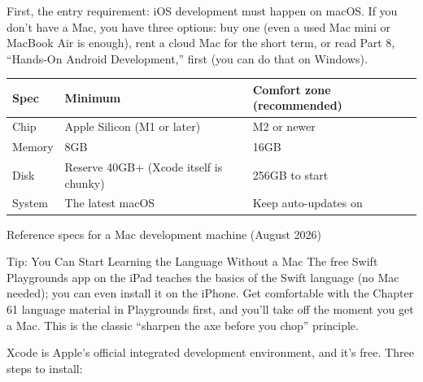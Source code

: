 


First, the entry requirement: iOS development must happen on macOS. If you don't have a Mac, you have three options: buy one (even a used Mac mini or MacBook Air is enough), rent a cloud Mac for the short term, or read Part 8, “Hands-On Android Development,” first (you can do that on Windows).

\begin{center}
\begin{tabularx}{\linewidth}{|X|X|X|}
\hline
\textbf{Spec} & \textbf{Minimum} & \textbf{Comfort zone (recommended)} \tabularnewline
\hline
Chip & Apple Silicon (M1 or later) & M2 or newer \tabularnewline
Memory & 8GB & 16GB \tabularnewline
Disk & Reserve 40GB+ (Xcode itself is chunky) & 256GB to start \tabularnewline
System & The latest macOS & Keep auto-updates on \tabularnewline
\hline
\end{tabularx}
\end{center}

\begin{center}\small\color{gray}Reference specs for a Mac development machine (August 2026)\end{center}

\begin{tcbinfo}{Tip: You Can Start Learning the Language Without a Mac}
The free Swift Playgrounds app on the iPad teaches the basics of the Swift language (no Mac needed); you can even install it on the iPhone. Get comfortable with the Chapter 61 language material in Playgrounds first, and you'll take off the moment you get a Mac. This is the classic “sharpen the axe before you chop” principle.

\end{tcbinfo}


Xcode is Apple's official integrated development environment, and it's free. Three steps to install:

